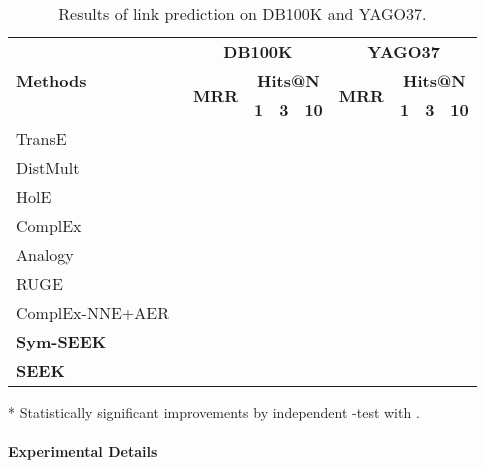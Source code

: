 \documentclass[11pt,a4paper]{article}
\newcommand{\TableSize}{\footnotesize} \renewcommand{\thefootnote}{\fnsymbol{footnote}}
\begin{document}
\begin{table*}[!h]
	\centering
	\begin{threeparttable}
		
		\TableSize
		\begin{tabular}{ l |c  c  c  c | c  c  c  c}
			\toprule
			\multirow{3}{*}{\textbf{Methods}} & \multicolumn{4}{c|}{\textbf{DB100K}} &  \multicolumn{4}{c}{\textbf{YAGO37}} \\
			\cmidrule{2-9}
			& \multirow{2}{*}{\textbf{MRR}}  &  \multicolumn{3}{c|}{\textbf{Hits@N}} & \multirow{2}{*}{\textbf{MRR}}  &  \multicolumn{3}{c}{\textbf{Hits@N}} \\ 
			\cmidrule{3-5}	\cmidrule{7-9}
			&  & \textbf{1} & \textbf{3} & \textbf{10} & & \textbf{1} & \textbf{3} & \textbf{10}  \\ 
			\midrule
			TransE~\cite{bordes2013translating}&  &  &  &  &  &  &  &    \\
			DistMult~\cite{yang2015embedding}&  &  &  &  &  &  &  &  \\
			HolE~\cite{nickel2016holographic} &  &  &  &  &   &  &  &   \\
			ComplEx~\cite{trouillon2016complex}&  &  &  &   &  &  &  &  \\		
			Analogy~\cite{liu2017analogical} &  &  &  &  &  &  &  &  \\
			\midrule
			RUGE~\cite{guo2018:RUGE}&  &  &  &  & &  &  &  \\
			ComplEx-NNE+AER~\cite{boyang2018:aer} &  &  &  &  &  &  &  &  \\
			\midrule
			\textbf{Sym-SEEK}\tnote{*} &  &   &  &  & &   &  &  \\
			\textbf{SEEK}\tnote{*} &  &   &  &  & &   &  &  \\
			\bottomrule
		\end{tabular}
		\begin{tablenotes}
			\item[*] Statistically significant improvements by independent -test with .
		\end{tablenotes}
		
	\end{threeparttable}
	\caption{Results of link prediction on DB100K and YAGO37.}
	\label{tab:kbc-performance-yago37-db100k}
\end{table*}

\paragraph*{Experimental Details}
\end{document}
